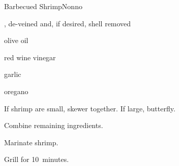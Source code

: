 \begin{recipe}{Barbecued Shrimp}{Nonno}{}

\begin{ingredients}
\item {}, de-veined and, if desired, shell removed 
\item olive oil
\item red wine vinegar
\item garlic
\item oregano
\end{ingredients}

\begin{directions}
\item If shrimp are small, skewer together. If large, butterfly.
\item Combine remaining ingredients.
\item Marinate shrimp.
\item Grill for 10~minutes.
\end{directions}

\end{recipe}
